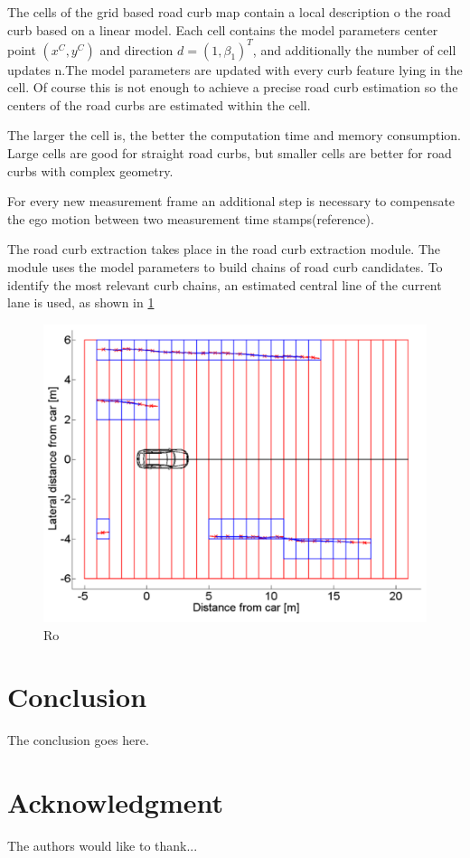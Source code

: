 \documentclass[conference]{IEEEtran}
\begin{document}
The cells of the grid based road curb map contain a local description o the road curb based on a linear model. Each cell contains the model parameters center point $(x^C, y^C)$ and direction $d = (1, \beta_1)^T$, and additionally the number of cell updates n.The model parameters are updated with every curb feature lying in the cell. Of course this is not enough to achieve a precise road curb estimation so the centers of the road curbs are estimated within the cell.

The larger the cell is, the better the computation time and memory consumption. Large cells are good for straight road curbs, but smaller cells are better for road curbs with complex geometry.

For every new measurement frame an additional step is necessary to compensate the ego motion between two measurement time stamps(reference). 

The road curb extraction takes place in the road curb extraction module. The module uses the model parameters to build chains of road curb candidates. To identify the most relevant curb chains, an estimated central line of the current lane is used, as shown in \ref{fig5}

\begin{figure}[ht]
	\centering
  \includegraphics[scale = 0.6]{pictures/extractor.pdf}
	\caption{Ro}
	\label{fig5}
\end{figure}

\section{Conclusion}
The conclusion goes here.
\nocite{*}

\section*{Acknowledgment}

The authors would like to thank...





\end{document}
